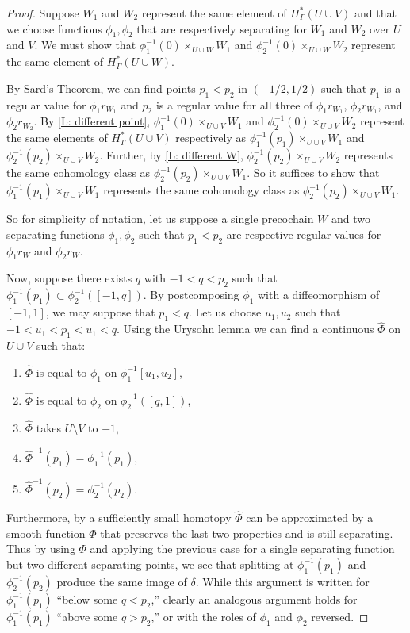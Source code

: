 \begin{proof}
	Suppose $W_1$ and $W_2$ represent the same element of $H^*_\Gamma(U \cup V)$ and that we choose functions $\phi_1,\phi_2$ that are respectively separating for $W_1$ and $W_2$ over $U$ and $V$.
	We must show that $\phi_1^{-1}(0)\times_{U \cup W} W_1$ and $\phi_2^{-1}(0)\times_{U \cup W} W_2$ represent the same element of $H^*_\Gamma(U \cup W)$.

	By Sard's Theorem, we can find points $p_1<p_2$ in $(-1/2,1/2)$ such that $p_1$ is a regular value for $\phi_1 r_{W_1}$ and $p_2$ is a regular value for all three of $\phi_1 r_{W_1}$, $\phi_2 r_{W_1}$, and $\phi_2 r_{W_2}$.
	By \cref{L: different point}, $\phi_1^{-1}(0) \times_{U \cup V} W_1$ and $\phi_2^{-1}(0) \times_{U \cup V} W_2$ represent the same elements of $H^*_\Gamma(U \cup V)$ respectively as $\phi_1^{-1}(p_1) \times_{U \cup V} W_1$ and $\phi_2^{-1}(p_2) \times_{U \cup V} W_2$.
	Further, by \cref{L: different W}, $\phi_2^{-1}(p_2) \times_{U \cup V} W_2$ represents the same cohomology class as $\phi_2^{-1}(p_2) \times_{U \cup V} W_1$.
	So it suffices to show that $\phi_1^{-1}(p_1) \times_{U \cup V} W_1$ represents the same cohomology class as $\phi_2^{-1}(p_2) \times_{U \cup V} W_1$.

 	So for simplicity of notation, let us suppose a single precochain $W$ and two separating functions $\phi_1,\phi_2$ such that $p_1 < p_2$ are respective regular values for $\phi_1 r_W$ and $\phi_2 r_W$.

	Now, suppose there exists $q$ with $-1<q<p_2$ such that $\phi_1^{-1}(p_1) \subset \phi_2^{-1}([-1,q])$.
	By postcomposing $\phi_1$ with a diffeomorphism of $[-1,1]$, we may suppose that $p_1<q$.
	Let us choose $u_1,u_2$ such that $-1<u_1<p_1<u_1<q$.
	Using the Urysohn lemma we can find a continuous $\hat \Phi$ on $U \cup V$ such that:

	\begin{enumerate}
		\item $\hat \Phi$ is equal to $\phi_1$ on $\phi_1^{-1}[u_1,u_2]$,
		\item $\hat\Phi$ is equal to $\phi_2$ on $\phi_2^{-1}([q,1])$,

		\item $\hat\Phi$ takes $U\setminus V$ to $-1$,

		\item $\hat\Phi^{-1}(p_1) = \phi_1^{-1}(p_1)$,

		\item $\hat\Phi^{-1}(p_2) = \phi_2^{-1}(p_2)$.
	\end{enumerate}
	Furthermore, by a sufficiently small homotopy $\hat\Phi$ can be approximated by a smooth function $\Phi$ that preserves the last two properties and is still separating.
	Thus by using $\Phi$ and applying the previous case for a single separating function but two different separating points, we see that splitting at $\phi_1^{-1}(p_1)$ and $\phi_2^{-1}(p_2)$ produce the same image of $\delta$.
	While this argument is written for $\phi_1^{-1}(p_1)$ ``below some $q<p_2$,'' clearly an analogous argument holds for $\phi_1^{-1}(p_1)$ ``above some $q>p_2$,'' or with the roles of $\phi_1$ and $\phi_2$ reversed.


\end{proof}

